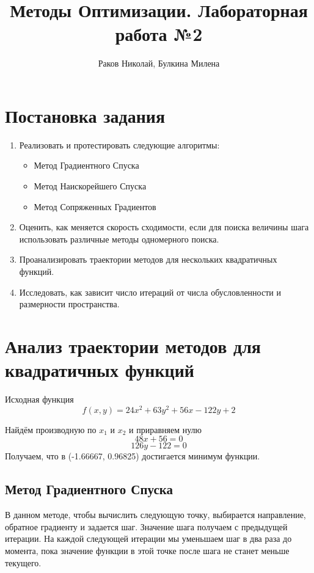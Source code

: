 \documentclass[a4paper,12pt]{article}
\title{Методы Оптимизации. Лабораторная работа №2}
\author{Раков Николай, Булкина Милена}
\date{}
\begin{document}
\maketitle
\clearpage

\section{Постановка задания}

\begin{enumerate} 
\item Реализовать и протестировать следующие алгоритмы:
\begin{itemize}
\item Метод Градиентного Спуска
\item Метод Наискорейшего Спуска
\item Метод Сопряженных Градиентов
\end{itemize}

\item Оценить, как меняется скорость сходимости, если для поиска величины шага использовать различные методы одномерного поиска.
\item Проанализировать траектории методов для нескольких квадратичных функций.
\item Исследовать, как зависит число итераций от числа обусловленности и размерности пространства.

\end{enumerate}

\section{Анализ траектории методов для квадратичных функций}

Исходная функция
\begin{equation*}
    f(x, y) = 24x^2 + 63y^2 + 56x - 122y + 2
\end{equation*}

Найдём производную по $x_1$ и $x_2$ и приравняем нулю
    \[48x + 56 = 0\]
    \[126y - 122 = 0\]
Получаем, что в (-1.66667, 0.96825) достигается минимум функции.

\clearpage

\subsection{Метод Градиентного Спуска}

В данном методе, чтобы вычислить следующую точку, выбирается направление, обратное градиенту и задается шаг. Значение шага получаем с предыдущей итерации. На каждой следующей итерации мы уменьшаем шаг в два раза до момента, пока значение функции в этой точке после шага не станет меньше текущего.
\end{document}
